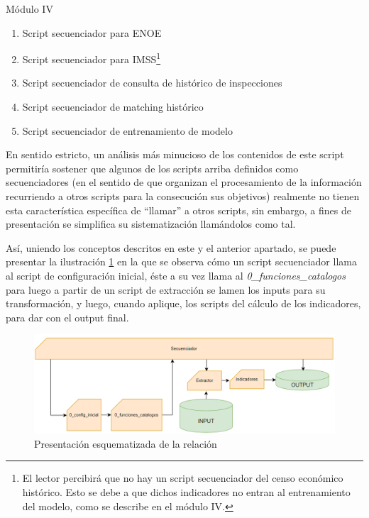 \documentclass[
]{article}
\begin{document}
Módulo IV

\begin{enumerate}
\def\labelenumi{\arabic{enumi})}
\setcounter{enumi}{6}
\item
  Script secuenciador para ENOE
\item
  Script secuenciador para IMSS\footnote{El lector percibirá que no hay un script secuenciador del censo económico histórico. Esto se debe a que dichos indicadores no entran al entrenamiento del modelo, como se describe en el módulo IV.}
\item
  Script secuenciador de consulta de histórico de inspecciones
\item
  Script secuenciador de matching histórico
\item
  Script secuenciador de entrenamiento de modelo
\end{enumerate}

En sentido estricto, un análisis más minucioso de los contenidos de este script permitiría sostener que algunos de los scripts arriba definidos como secuenciadores (en el sentido de que organizan el procesamiento de la información recurriendo a otros scripts para la consecución sus objetivos) realmente no tienen esta característica específica de ``llamar'' a otros scripts, sin embargo, a fines de presentación se simplifica su sistematización llamándolos como tal.

Así, uniendo los conceptos descritos en este y el anterior apartado, se puede presentar la ilustración \ref{fig:secConfigInicial} en la que se observa cómo un script secuenciador llama al script de configuración inicial, éste a su vez llama al \emph{0\_funciones\_catalogos} para luego a partir de un script de extracción se lamen los inputs para su transformación, y luego, cuando aplique, los scripts del cálculo de los indicadores, para dar con el output final.

\begin{figure}
\includegraphics[width=14.56in]{images-1/02/sec_config_inicial} \caption{Presentación esquematizada de la relación }\label{fig:secConfigInicial}
\end{figure}
\end{document}
